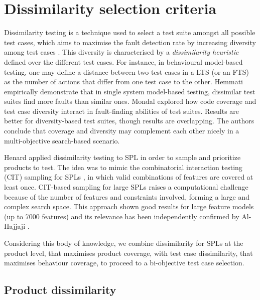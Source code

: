 \section{Dissimilarity selection criteria}

\label{sec:coverage:dissimilaritycrit}

Dissimilarity testing is a technique used to select a test suite amongst all possible test cases, which aims to maximise the fault detection rate by increasing diversity among test cases \cite{Cartaxo2011,Hemmati2013}. This diversity is characterised by a \emph{dissimilarity heuristic} defined over the different test cases. For instance, in behavioural model-based testing, one may define a distance between two test cases in a LTS (or an FTS) as the number of actions that differ from one test case to the other. Hemmati \etal \cite{Hemmati2013} empirically demonstrate that in single system model-based testing, dissimilar test suites find more faults than similar ones. Mondal \etal \cite{Mondal2015} explored how code coverage and test case diversity interact in fault-finding abilities of test suites. Results are better for diversity-based test suites, though results are overlapping. The authors conclude that coverage and diversity may complement each other nicely in a multi-objective search-based scenario.    

Henard \etal \cite{Henard2014a} applied dissimilarity testing to SPL in order to sample and prioritize products to test. The idea was to mimic the combinatorial interaction testing (CIT) sampling for SPLs  \cite{Perrouin2011,Lochau2011}, in which valid combinations of features are covered at least once. CIT-based sampling for large SPLs raises a computational challenge because of the number of features and constraints involved, forming a large and complex search space.  
This approach shown good results for large feature models (up to 7000 features) and its relevance has been independently confirmed by Al-Hajjaji \etal \cite{Al-Hajjaji2016}.   

Considering this body of knowledge, we combine dissimilarity for SPLs at the product level, that maximises product coverage, with test case dissimilarity, that maximises behaviour coverage, to proceed to a bi-objective test case selection. 


\subsection{Product dissimilarity}

